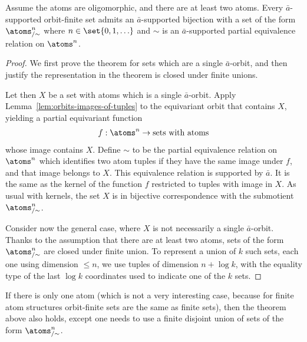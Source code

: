 \begin{theorem}\label{thm:partial-equivalence-representation} Assume the atoms are oligomorphic, and there are at least two atoms. Every $\bar a$-supported orbit-finite set admits an $\bar a$-supported bijection with a set of the form $\atoms^n_{/\sim}$ where $n \in \set{0,1,\ldots}$ and $\sim$ is an $\bar a$-supported partial equivalence relation on $\atoms^n$.
\end{theorem}
\begin{proof} 
   We first prove the theorem for sets which are a single $\bar a$-orbit, and then justify the representation in the theorem is closed under finite unions. 
   
   Let then $X$ be a set with atoms which is a single $\bar a$-orbit. Apply Lemma~\ref{lem:orbits-images-of-tuples} to the equivariant orbit that contains $X$, yielding a partial equivariant function
   \begin{align*}
	f : \atoms^{n} \to \text{sets with atoms}
   \end{align*}
   whose image contains $X$. 
   Define $\sim$ to be the partial equivalence relation on $\atoms^n$ which identifies two atom tuples if they have the same image under $f$, and that image belongs to $X$. 
   This equivalence relation is supported by $\bar a$. It is the same as the kernel of the function $f$ restricted to tuples with image in $X$. As usual with kernels, the set $X$ is in bijective correspondence with the submotient $\atoms^{n}_{/\sim}$. 

   Consider now the general case, where $X$ is not necessarily a single $\bar a$-orbit. Thanks to the assumption that there are at least two atoms, sets of the form $\atoms^n_{/\sim}$ are closed under finite union. To represent a union of $k$ such sets, each one using dimension $\le n$, we use tuples of dimension $n + \log k$, with the equality type of the last $\log k$ coordinates used to indicate one of the $k$ sets.
\end{proof}

If there is only one atom (which is not a very interesting case, because for finite atom structures orbit-finite sets are the same as finite sets), then the theorem above also holds, except one needs to use a finite disjoint union of sets of the form $\atoms^n_{/\sim}$.




